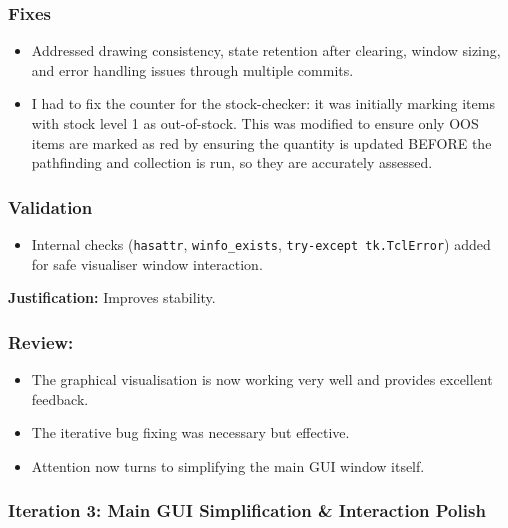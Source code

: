 \subsubsection{Fixes}
\begin{itemize}
	\item Addressed drawing consistency, state retention after clearing, window sizing, and error handling issues through multiple commits.
	
	\item I had to fix the counter for the stock-checker: it was initially marking items with stock level 1 as out-of-stock. This was modified to ensure only OOS items are marked as red by ensuring the quantity is updated BEFORE the pathfinding and collection is run, so they are accurately assessed.
\end{itemize}

\subsubsection{Validation}
\begin{itemize}
	\item Internal checks (\verb|hasattr|, \verb|winfo_exists|, \verb|try-except tk.TclError|) added for safe visualiser window interaction.
\end{itemize}
\textbf{Justification:} Improves stability.

\subsubsection{Review:}
\begin{itemize}
	\item The graphical visualisation is now working very well and provides excellent feedback.
	\item The iterative bug fixing was necessary but effective.
	\item Attention now turns to simplifying the main GUI window itself.
\end{itemize}

\subsubsection{Iteration 3: Main GUI Simplification \& Interaction Polish}

